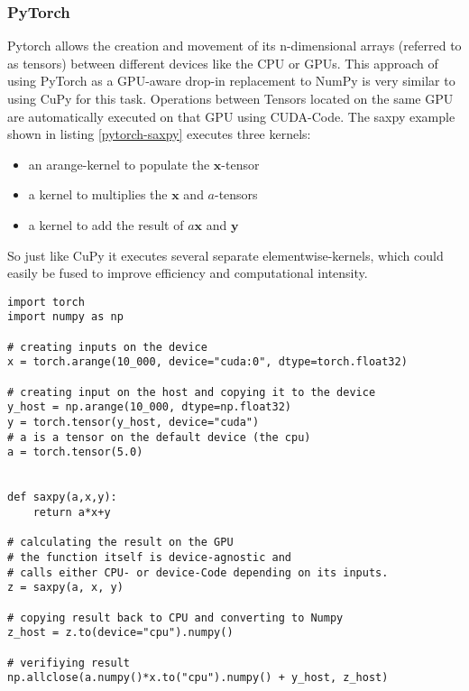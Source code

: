 \documentclass[english,11pt,a4paper,table]{article} %
\begin{document}

\subsubsection{PyTorch}

Pytorch allows the creation and movement of its n-dimensional arrays (referred to as tensors) between different devices like the CPU or GPUs.
This approach of using PyTorch as a GPU-aware drop-in replacement to NumPy is very similar to using CuPy for this task.
Operations between Tensors located on the same GPU are automatically executed on that GPU using CUDA-Code.
The saxpy example shown in listing \ref{pytorch-saxpy} executes three kernels:

\begin{itemize}
	\item{an arange-kernel to populate the $\mathbf{x}$-tensor}
	\item {a kernel to multiplies the $\mathbf{x}$ and $a$-tensors}
	\item {a kernel to add the result of $a\mathbf{x}$ and $\mathbf{y}$}
\end{itemize}

So just like CuPy it executes several separate elementwise-kernels, which could easily be fused to improve efficiency and computational intensity.

\begin{verbatim}
import torch
import numpy as np

# creating inputs on the device
x = torch.arange(10_000, device="cuda:0", dtype=torch.float32)

# creating input on the host and copying it to the device
y_host = np.arange(10_000, dtype=np.float32)
y = torch.tensor(y_host, device="cuda")
# a is a tensor on the default device (the cpu)
a = torch.tensor(5.0)


def saxpy(a,x,y):
    return a*x+y

# calculating the result on the GPU
# the function itself is device-agnostic and 
# calls either CPU- or device-Code depending on its inputs.
z = saxpy(a, x, y)

# copying result back to CPU and converting to Numpy
z_host = z.to(device="cpu").numpy()

# verifiying result
np.allclose(a.numpy()*x.to("cpu").numpy() + y_host, z_host)
\end{verbatim}
\end{document}
